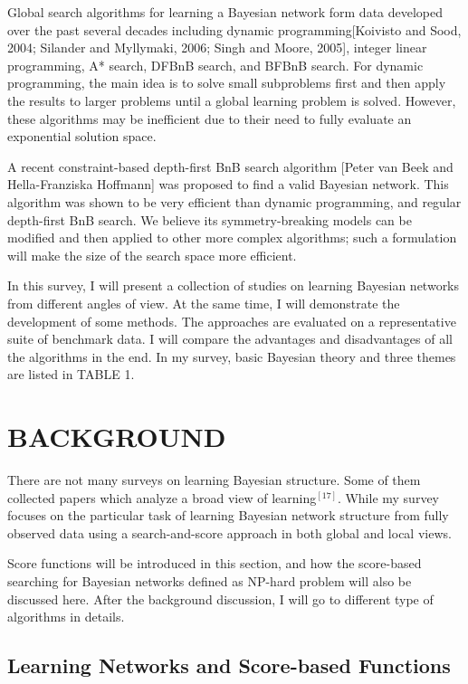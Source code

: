 \documentclass[a4paper,12pt]{article}
\begin{document}
Global search algorithms for learning a Bayesian network form data developed over the past several decades including dynamic programming[Koivisto and Sood, 2004; Silander and Myllymaki, 2006; Singh and Moore, 2005], integer linear programming, A* search, DFBnB search, and BFBnB search. For dynamic programming, the main idea is to solve small subproblems first and then apply the results to larger problems until a global learning problem is solved. However, these algorithms may be inefficient due to their need to fully evaluate an exponential solution space.

A recent constraint-based depth-first BnB search algorithm [Peter van Beek and Hella-Franziska Hoffmann] was proposed to find a valid Bayesian network. This algorithm was shown to be very efficient than dynamic programming, and regular depth-first BnB search. We believe its symmetry-breaking models can be modified and then applied to other more complex algorithms; such a formulation will make the size of the search space more efficient. 

In this survey, I will present a collection of studies on learning Bayesian networks from different angles of view. At the same time, I will demonstrate the development of some methods. The approaches are evaluated on a representative suite of benchmark data. I will compare the advantages and disadvantages of all the algorithms in the end. In my survey, basic Bayesian theory and three themes are listed in TABLE 1.


\section{BACKGROUND}
%
There are not many surveys on learning Bayesian structure. Some of them collected papers which analyze a broad view of learning$^{[17]}$. While my survey focuses on the particular task of learning Bayesian network structure from fully observed data using a search-and-score approach in both global and local views.

Score functions will be introduced in this section, and how the score-based searching for Bayesian networks defined as NP-hard problem will also be discussed here. After the background discussion, I will go to different type of algorithms in details.

\subsection{Learning Networks and Score-based Functions }
\end{document}
